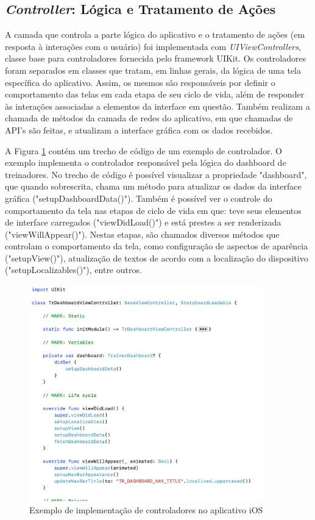 \subsection{\textit{Controller}: Lógica e Tratamento de Ações}
A camada que controla a parte lógica do aplicativo e o tratamento de ações (em resposta à interações com o usuário) foi implementada com \textit{UIViewControllers}, classe base para controladores fornecida pelo framework UIKit. Os controladores foram separados em classes que tratam, em linhas gerais, da lógica de uma tela específica do aplicativo. Assim, os mesmos são responsáveis por definir o comportamento das telas em cada etapa de seu ciclo de vida, além de responder às interações associadas a elementos da interface em questão. Também realizam a chamada de métodos da camada de redes do aplicativo, em que chamadas de API's são feitas, e atualizam a interface gráfica com os dados recebidos.

A Figura \ref{fig:controller-example} contém um trecho de código de um exemplo de controlador. O exemplo implementa o controlador responsável pela lógica do dashboard de treinadores. No trecho de código é possível visualizar a propriedade "dashboard", que quando sobrescrita, chama um método para atualizar os dados da interface gráfica ("setupDashboardData()"). Também é possível ver o controle do comportamento da tela nas etapas de ciclo de vida em que: teve seus elementos de interface carregados ("viewDidLoad()") e está prestes a ser renderizada ("viewWillAppear()"). Nestas etapas, são chamados diversos métodos que controlam o comportamento da tela, como configuração de aspectos de aparência ("setupView()"), atualização de textos de acordo com a localização do dispositivo ("setupLocalizables()"), entre outros.

\begin{figure}[H]
    \centering
    \includegraphics[width=0.9\textwidth]{pfc/figuras/ex-tr-dashboard.png}
    \caption{Exemplo de implementação de controladores no aplicativo iOS}
    \label{fig:controller-example}
\end{figure}

